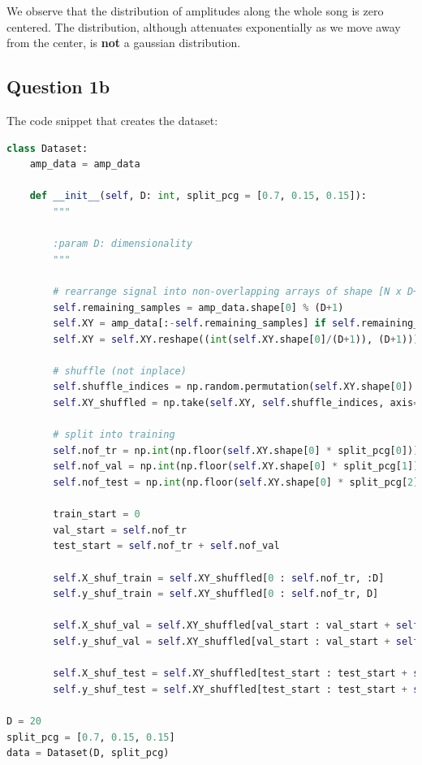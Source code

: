 \documentclass{article}
\begin{document}
We observe that the distribution of amplitudes along the whole song is zero centered. The distribution, although attenuates exponentially as we move away from the center, is \textbf{not} a gaussian distribution.

\subsection{Question 1b}

The code snippet that creates the dataset:

\begin{lstlisting}[language=Python]
class Dataset:
    amp_data = amp_data
    
    def __init__(self, D: int, split_pcg = [0.7, 0.15, 0.15]):
        """
        
        :param D: dimensionality 
        """
        
        # rearrange signal into non-overlapping arrays of shape [N x D+1]
        self.remaining_samples = amp_data.shape[0] % (D+1)
        self.XY = amp_data[:-self.remaining_samples] if self.remaining_samples > 0 else amp_data
        self.XY = self.XY.reshape((int(self.XY.shape[0]/(D+1)), (D+1)))
        
        # shuffle (not inplace)
        self.shuffle_indices = np.random.permutation(self.XY.shape[0])
        self.XY_shuffled = np.take(self.XY, self.shuffle_indices, axis=0)
        
        # split into training
        self.nof_tr = np.int(np.floor(self.XY.shape[0] * split_pcg[0]))
        self.nof_val = np.int(np.floor(self.XY.shape[0] * split_pcg[1]))
        self.nof_test = np.int(np.floor(self.XY.shape[0] * split_pcg[2]))
        
        train_start = 0
        val_start = self.nof_tr
        test_start = self.nof_tr + self.nof_val
        
        self.X_shuf_train = self.XY_shuffled[0 : self.nof_tr, :D]
        self.y_shuf_train = self.XY_shuffled[0 : self.nof_tr, D]
        
        self.X_shuf_val = self.XY_shuffled[val_start : val_start + self.nof_val, :D]
        self.y_shuf_val = self.XY_shuffled[val_start : val_start + self.nof_val, D]
        
        self.X_shuf_test = self.XY_shuffled[test_start : test_start + self.nof_test, :D]
        self.y_shuf_test = self.XY_shuffled[test_start : test_start + self.nof_test, D]
    
D = 20
split_pcg = [0.7, 0.15, 0.15]
data = Dataset(D, split_pcg)
\end{lstlisting}
\end{document}
